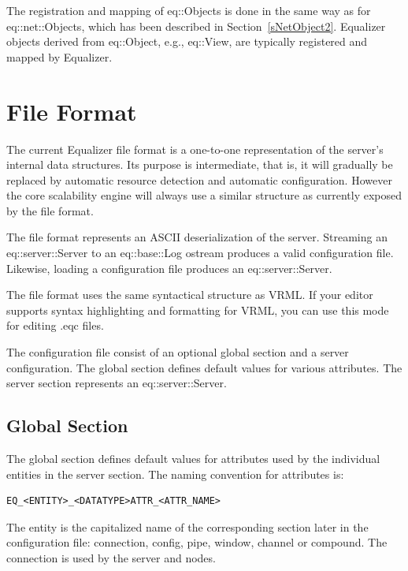 \documentclass[10pt,a4]{scrartcl}
\newcommand{\sref}[1]{Section~\ref{#1}}
\begin{document}
The registration and mapping of \textsf{eq::Object}s is done in the same
way as for \textsf{eq::net::Object}s, which has been described in
\sref{sNetObject2}. Equalizer objects derived from \textsf{eq::Object},
e.g., \textsf{eq::View}, are typically registered and mapped by
Equalizer.


\newpage
\appendix
\section{\label{aFileFormat}File Format}

The current Equalizer file format is a one-to-one representation of the
server's internal data structures. Its purpose is intermediate, that is,
it will gradually be replaced by automatic resource detection and
automatic configuration. However the core scalability engine will always
use a similar structure as currently exposed by the file format.

The file format represents an ASCII deserialization of the
server. Streaming an \textsf{eq::server::Server} to an \textsf{eq::base::Log}
ostream produces a valid configuration file. Likewise, loading a
configuration file produces an \textsf{eq::server::Server}.

The file format uses the same syntactical structure as VRML. If your
editor supports syntax highlighting and formatting for VRML, you can use
this mode for editing \textsf{.eqc} files.

The configuration file consist of an optional global section and a
server configuration. The global section defines default values for
various attributes. The server section represents an
\textsf{eq::server::Server}.


\subsection{\label{sGlobal}Global Section}

The global section defines default values for attributes used by the
individual entities in the server section. The naming convention for
attributes is:

{\footnotesize\begin{lstlisting}
EQ_<ENTITY>_<DATATYPE>ATTR_<ATTR_NAME>
\end{lstlisting}}

The entity is the capitalized name of the corresponding section later in
the configuration file: connection, config, pipe, window, channel or
compound. The connection is used by the server and nodes.
\end{document}
